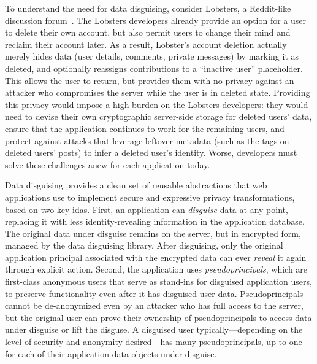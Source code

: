 %
%
To understand the need for data disguising, consider Lobsters, a Reddit-like
discussion forum~\cite{lobsters}.
%
The Lobsters developers already provide an option for a user to delete their own
account, but also permit users to change their mind and reclaim their
account later.
%
As a result, Lobster's account deletion actually merely hides data (\eg user
details, comments, private messages) by marking it as deleted, and optionally
reassigns contributions to a ``inactive user'' placeholder.
%
This allows the user to return, but provides them with no privacy against an
attacker who compromises the server while the user is in deleted state.
%
Providing this privacy would impose a high burden on the
Lobsters developers: they would need to devise their own cryptographic
server-side storage for deleted users' data,
%
ensure that the application continues to work for the remaining users, and
protect against attacks that leverage leftover metadata (such as the tags on
deleted users' posts) to infer a deleted user's identity.
%
Worse, developers must solve these challenges anew for each application
today.
%

%
%
Data disguising provides a clean set of reusable abstractions that web
applications use to implement secure and expressive privacy transformations,
based on two key idas.
%
%
First, an application can \emph{disguise} data at any point, replacing it with
less identity-revealing information in the application database.
%
The original data under disguise remains on the server, but in encrypted form,
managed by the data disguising library.
%
After disguising, only the original application principal associated with the
encrypted data can ever \emph{reveal} it again through explicit action.
%
Second, the application uses \emph{pseudoprincipals}, which are first-class
anonymous users that serve as stand-ins for disguised application users, to
preserve functionality even after it has disguised user data.
%
Pseudoprincipals cannot be de-anonymized even by an attacker who has full
access to the server, but the original user can prove their ownership of
pseudoprincipals to access data under disguise or lift the disguse.
%
A disguised user typically---depending on the level of security and anonymity
desired---has many pseudoprincipals, up to one for each of their application
data objects under disguise.
%

